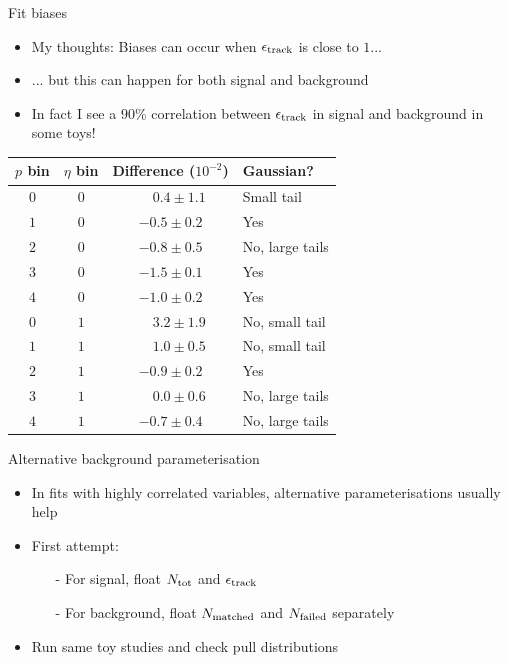 \documentclass[xcolor={dvipsnames}]{beamer}
\begin{document}
\begin{frame}{Fit biases}
  \vspace{0.0cm}
  \begin{itemize}
    \setlength\itemsep{0.0em}
    \item{My thoughts: Biases can occur when $\epsilon_{\rm track}$ is close to $1$...}
    \item{... but this can happen for both signal and background}
    \item{In fact I see a $90\%$ correlation between $\epsilon_{\rm track}$ in signal and background in some toys!}
  \end{itemize}
  \begin{center}
    \begin{tabular}{cccl}
      \hline
      $p$ bin & $\eta$ bin & Difference ($10^{-2}$)   & Gaussian? \\
      \hline
      $0$     & $0$        & $\phantom{-}0.4 \pm 1.1$ & Small tail \\
      $1$     & $0$        & $-0.5 \pm 0.2$           & Yes \\
      $2$     & $0$        & $-0.8 \pm 0.5$           & No, large tails \\
      $3$     & $0$        & $-1.5 \pm 0.1$           & Yes \\
      $4$     & $0$        & $-1.0 \pm 0.2$           & Yes \\
      $0$     & $1$        & $\phantom{-}3.2 \pm 1.9$ & No, small tail \\
      $1$     & $1$        & $\phantom{-}1.0 \pm 0.5$ & No, small tail \\
      $2$     & $1$        & $-0.9 \pm 0.2$           & Yes \\
      $3$     & $1$        & $\phantom{-}0.0 \pm 0.6$ & No, large tails \\
      $4$     & $1$        & $-0.7 \pm 0.4$           & No, large tails \\
      \hline
    \end{tabular}
  \end{center}
\end{frame}

\begin{frame}{Alternative background parameterisation}
  \vspace{0.0cm}
  \begin{itemize}
    \setlength\itemsep{1.0em}
    \item{In fits with highly correlated variables, alternative parameterisations usually help}
    \item{First attempt:}
    \begin{itemize}
      \item[-]{For signal, float $N_{\rm tot}$ and $\epsilon_{\rm track}$}
      \item[-]{For background, float $N_{\rm matched}$ and $N_{\rm failed}$ separately}
    \end{itemize}
    \item{Run same toy studies and check pull distributions}
  \end{itemize}
\end{frame}
\end{document}
